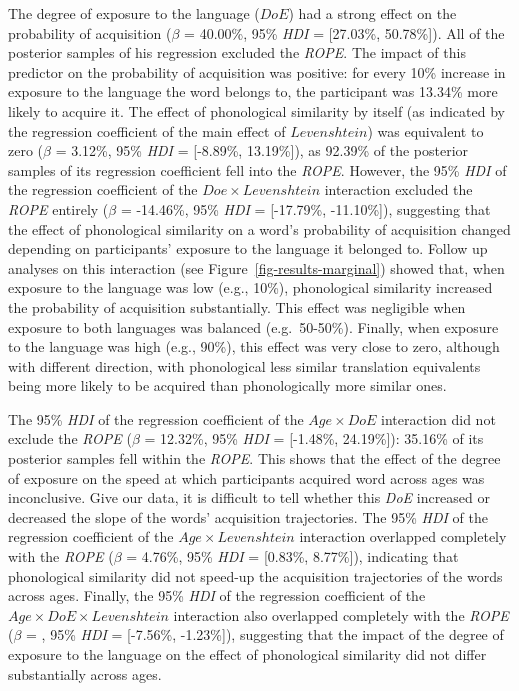 \documentclass[
  letterpaper,
  DIV=11,
  numbers=noendperiod]{scrartcl}
\begin{document}
The degree of exposure to the language (\(DoE\)) had a strong effect on
the probability of acquisition (\(\beta\) = 40.00\%, 95\% \emph{HDI} =
{[}27.03\%, 50.78\%{]}). All of the posterior samples of his regression
excluded the \emph{ROPE}. The impact of this predictor on the
probability of acquisition was positive: for every 10\% increase in
exposure to the language the word belongs to, the participant was
13.34\% more likely to acquire it. The effect of phonological similarity
by itself (as indicated by the regression coefficient of the main effect
of \(Levenshtein\)) was equivalent to zero (\(\beta\) = 3.12\%, 95\%
\emph{HDI} = {[}-8.89\%, 13.19\%{]}), as 92.39\% of the posterior
samples of its regression coefficient fell into the \emph{ROPE}.
However, the 95\% \emph{HDI} of the regression coefficient of the
\(Doe \times Levenshtein\) interaction excluded the \emph{ROPE} entirely
(\(\beta\) = -14.46\%, 95\% \emph{HDI} = {[}-17.79\%, -11.10\%{]}),
suggesting that the effect of phonological similarity on a word's
probability of acquisition changed depending on participants' exposure
to the language it belonged to. Follow up analyses on this interaction
(see Figure~\ref{fig-results-marginal}) showed that, when exposure to
the language was low (e.g., 10\%), phonological similarity increased the
probability of acquisition substantially. This effect was negligible
when exposure to both languages was balanced (e.g.~50-50\%). Finally,
when exposure to the language was high (e.g., 90\%), this effect was
very close to zero, although with different direction, with phonological
less similar translation equivalents being more likely to be acquired
than phonologically more similar ones.

The 95\% \emph{HDI} of the regression coefficient of the
\(Age \times DoE\) interaction did not exclude the \emph{ROPE}
(\(\beta\) = 12.32\%, 95\% \emph{HDI} = {[}-1.48\%, 24.19\%{]}): 35.16\%
of its posterior samples fell within the \emph{ROPE}. This shows that
the effect of the degree of exposure on the speed at which participants
acquired word across ages was inconclusive. Give our data, it is
difficult to tell whether this \emph{DoE} increased or decreased the
slope of the words' acquisition trajectories. The 95\% \emph{HDI} of the
regression coefficient of the \(Age \times Levenshtein\) interaction
overlapped completely with the \emph{ROPE} (\(\beta\) = 4.76\%, 95\%
\emph{HDI} = {[}0.83\%, 8.77\%{]}), indicating that phonological
similarity did not speed-up the acquisition trajectories of the words
across ages. Finally, the 95\% \emph{HDI} of the regression coefficient
of the \(Age \times DoE \times Levenshtein\) interaction also overlapped
completely with the \emph{ROPE} (\(\beta\) = , 95\% \emph{HDI} =
{[}-7.56\%, -1.23\%{]}), suggesting that the impact of the degree of
exposure to the language on the effect of phonological similarity did
not differ substantially across ages.
\end{document}

